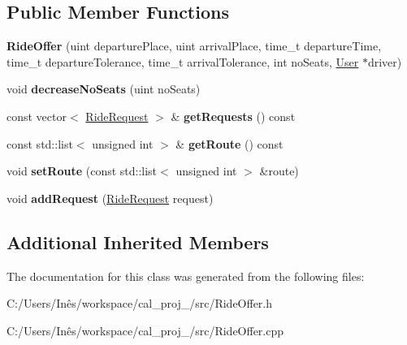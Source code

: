 \subsection*{Public Member Functions}
\begin{DoxyCompactItemize}
\item 
\hypertarget{class_ride_offer_ade002d578a8ee317d34c88d5b4b5e2d7}{}{\bfseries Ride\+Offer} (uint departure\+Place, uint arrival\+Place, time\+\_\+t departure\+Time, time\+\_\+t departure\+Tolerance, time\+\_\+t arrival\+Tolerance, int no\+Seats, \hyperlink{class_user}{User} $\ast$driver)\label{class_ride_offer_ade002d578a8ee317d34c88d5b4b5e2d7}

\item 
\hypertarget{class_ride_offer_a145cf12bbda55809eb41740cbd45a6f5}{}void {\bfseries decrease\+No\+Seats} (uint no\+Seats)\label{class_ride_offer_a145cf12bbda55809eb41740cbd45a6f5}

\item 
\hypertarget{class_ride_offer_a62e995e6e3cc7aaa074d2a9f69329212}{}const vector$<$ \hyperlink{class_ride_request}{Ride\+Request} $>$ \& {\bfseries get\+Requests} () const \label{class_ride_offer_a62e995e6e3cc7aaa074d2a9f69329212}

\item 
\hypertarget{class_ride_offer_aa03bcf9a56b427b96ca09f55e26c5e9c}{}const std\+::list$<$ unsigned int $>$ \& {\bfseries get\+Route} () const \label{class_ride_offer_aa03bcf9a56b427b96ca09f55e26c5e9c}

\item 
\hypertarget{class_ride_offer_a173345d8bc9af6b0d951f8202aab0fef}{}void {\bfseries set\+Route} (const std\+::list$<$ unsigned int $>$ \&route)\label{class_ride_offer_a173345d8bc9af6b0d951f8202aab0fef}

\item 
\hypertarget{class_ride_offer_a0dc50af57fdea2e2869e4414e7bb124c}{}void {\bfseries add\+Request} (\hyperlink{class_ride_request}{Ride\+Request} request)\label{class_ride_offer_a0dc50af57fdea2e2869e4414e7bb124c}

\end{DoxyCompactItemize}
\subsection*{Additional Inherited Members}


The documentation for this class was generated from the following files\+:\begin{DoxyCompactItemize}
\item 
C\+:/\+Users/\+Inês/workspace/cal\+\_\+proj\+\_/src/Ride\+Offer.\+h\item 
C\+:/\+Users/\+Inês/workspace/cal\+\_\+proj\+\_/src/Ride\+Offer.\+cpp\end{DoxyCompactItemize}
